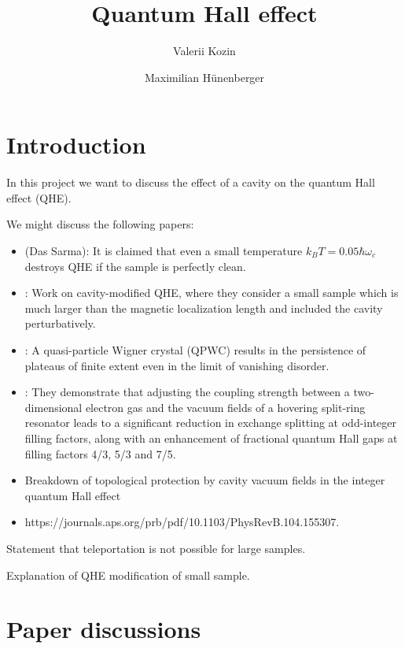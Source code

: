 \documentclass[
	secnumarabic, %
	nobibnotes, %
	aps, %
	prb, %
	floatfix, %
]{revtex4-2}
\begin{document}
\title{Quantum Hall effect}

\author{Valerii Kozin}
\author{Maximilian Hünenberger}


\maketitle


\section{Introduction}

In this project we want to discuss the effect of a cavity on the quantum Hall effect (QHE).

We might discuss the following papers:
\begin{itemize}
	\item \citet{yi-thomasIntegerQuantumHall2025} (Das Sarma):
		It is claimed that even a small temperature $k_B T = 0.05 \hbar \omega_c$ destroys QHE if the sample is perfectly clean.
	\item \citet{arwasQuantumElectronTransport2023}:
		Work on cavity-modified QHE, where they consider a small sample which is much larger than the magnetic localization length and included the cavity perturbatively.
	\item \citet{kimQuantumHallEffect2021}:
		A quasi-particle Wigner crystal (QPWC) results in the persistence of plateaus of finite extent even in the limit of vanishing disorder.
	\item \citet{enknerTunableVacuumfieldControl2025}:
		They demonstrate that adjusting the coupling strength between a two-dimensional electron gas and the vacuum fields of a hovering split-ring resonator leads to a significant reduction in exchange splitting at odd-integer filling factors, along with an enhancement of fractional quantum Hall gaps at filling factors 4/3, 5/3 and 7/5.
		\item Breakdown of topological protection by cavity vacuum fields in the integer quantum Hall effect
		\item https://journals.aps.org/prb/pdf/10.1103/PhysRevB.104.155307.
\end{itemize}

Statement that teleportation is not possible for large samples.

Explanation of QHE modification of small sample.

\section{Paper discussions}
\end{document}
